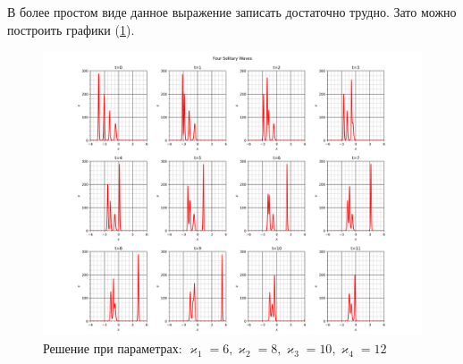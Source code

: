\documentclass[titlepage]{article}
\begin{document}
В более простом виде данное выражение записать достаточно трудно. Зато можно построить графики (\ref{fig}).
\begin{figure}[!h]
 \begin{center}
  \includegraphics[width=190mm]{Figure_1.png}
  \caption{Решение при параметрах: $\varkappa_1 = 6,\varkappa_2 =8,\varkappa_3=10,\varkappa_4 = 12 $}
  \label{fig}
 \end{center}
\end{figure}
\end{document}
